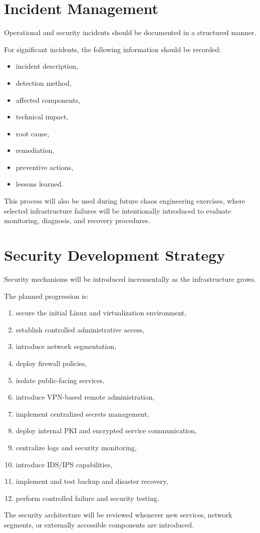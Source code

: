 \section{Incident Management}

Operational and security incidents should be documented in a structured
manner.

For significant incidents, the following information should be recorded:

\begin{itemize}
    \item incident description,
    \item detection method,
    \item affected components,
    \item technical impact,
    \item root cause,
    \item remediation,
    \item preventive actions,
    \item lessons learned.
\end{itemize}

This process will also be used during future chaos engineering exercises,
where selected infrastructure failures will be intentionally introduced
to evaluate monitoring, diagnosis, and recovery procedures.


\section{Security Development Strategy}

Security mechanisms will be introduced incrementally as the infrastructure
grows.

The planned progression is:

\begin{enumerate}
    \item secure the initial Linux and virtualization environment,
    \item establish controlled administrative access,
    \item introduce network segmentation,
    \item deploy firewall policies,
    \item isolate public-facing services,
    \item introduce VPN-based remote administration,
    \item implement centralized secrets management,
    \item deploy internal PKI and encrypted service communication,
    \item centralize logs and security monitoring,
    \item introduce IDS/IPS capabilities,
    \item implement and test backup and disaster recovery,
    \item perform controlled failure and security testing.
\end{enumerate}

The security architecture will be reviewed whenever new services,
network segments, or externally accessible components are introduced.